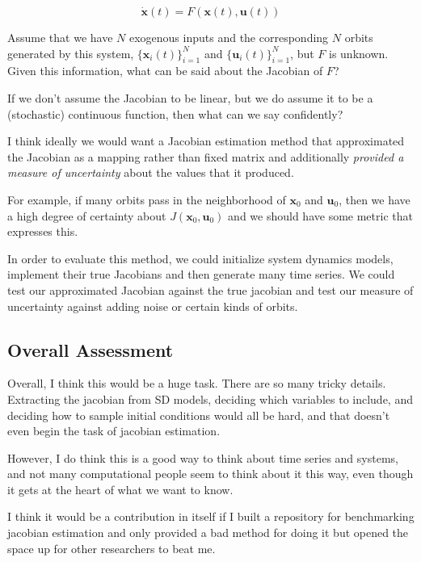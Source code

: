 \documentclass{article}
\begin{document}
        \[
            \dot{\bm{x}}(t) = F(\bm{x}(t), \bm{u}(t))
        \]

        Assume that we have $N$ exogenous inputs and the corresponding $N$ 
        orbits generated by this system, $\{\bm{x}_i(t)\}_{i=1}^N$ and
        $\{\bm{u}_i(t)\}_{i=1}^N$, but $F$ is unknown. Given this information,
        what can be said about the Jacobian of $F$?

        If we don't assume the Jacobian to be linear, but we do assume
        it to be a (stochastic) continuous function, then
        what can we say confidently?

        I think ideally we would want a Jacobian estimation method that
        approximated the Jacobian as a mapping rather than fixed matrix
        and additionally \textit{provided a measure of uncertainty} about
        the values that it produced.

        For example, if many orbits pass in the neighborhood of $\bm{x}_0$
        and $\bm{u}_0$, then we have a high degree of certainty about
        $J(\bm{x}_0, \bm{u}_0)$ and we should have some metric that expresses
        this. 

        In order to evaluate this method, we could initialize system
        dynamics models, implement their true Jacobians and
        then generate many time series. We could test our approximated
        Jacobian against the true jacobian and test our measure of
        uncertainty against adding noise or certain kinds of orbits.

        \subsection{Overall Assessment}
        Overall, I think this would be a huge task. There are so many
        tricky details.  Extracting the jacobian from SD models,
        deciding which variables to include, and deciding how to sample
        initial conditions would all be hard, and that doesn't even
        begin the task of jacobian estimation.

        However, I do think this is a good way to think about time
        series and systems, and not many computational people 
        seem to think about it this way, even though it gets at
        the heart of what we want to know.

        I think it would be a contribution in itself if I built a
        repository for benchmarking jacobian estimation and only
        provided a bad method for doing it but opened the space up for
        other researchers to beat me.
\end{document}
